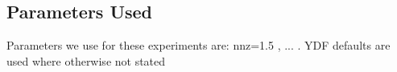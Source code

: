 \documentclass[sigconf]{acmart}
\begin{document}
\subsection{Parameters Used}

Parameters we use for these experiments are: nnz=1.5 , ... . YDF defaults are used where otherwise not stated

\end{document}
